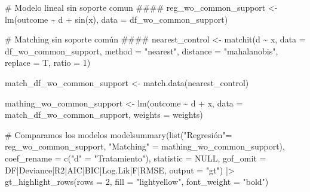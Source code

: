 \documentclass[
  letterpaper,
  DIV=11,
  numbers=noendperiod,
  oneside]{scrreprt}
\newenvironment{Shaded}{\begin{snugshade}}{\end{snugshade}}
\newcommand{\AttributeTok}[1]{\textcolor[rgb]{0.40,0.45,0.13}{#1}}
\newcommand{\CommentTok}[1]{\textcolor[rgb]{0.37,0.37,0.37}{#1}}
\newcommand{\ConstantTok}[1]{\textcolor[rgb]{0.56,0.35,0.01}{#1}}
\newcommand{\DecValTok}[1]{\textcolor[rgb]{0.68,0.00,0.00}{#1}}
\newcommand{\FunctionTok}[1]{\textcolor[rgb]{0.28,0.35,0.67}{#1}}
\newcommand{\NormalTok}[1]{\textcolor[rgb]{0.00,0.23,0.31}{#1}}
\newcommand{\OtherTok}[1]{\textcolor[rgb]{0.00,0.23,0.31}{#1}}
\newcommand{\SpecialCharTok}[1]{\textcolor[rgb]{0.37,0.37,0.37}{#1}}
\newcommand{\StringTok}[1]{\textcolor[rgb]{0.13,0.47,0.30}{#1}}
\begin{document}
\begin{Shaded}
\begin{Highlighting}[]
\CommentTok{\# Modelo lineal sin soporte comun \#\#\#\#}
\NormalTok{reg\_wo\_common\_support }\OtherTok{\textless{}{-}} \FunctionTok{lm}\NormalTok{(outcome }\SpecialCharTok{\textasciitilde{}}\NormalTok{ d }\SpecialCharTok{+} \FunctionTok{sin}\NormalTok{(x), }\AttributeTok{data =}\NormalTok{ df\_wo\_common\_support)}

\CommentTok{\# Matching sin soporte común \#\#\#\#}
\NormalTok{nearest\_control }\OtherTok{\textless{}{-}} \FunctionTok{matchit}\NormalTok{(d }\SpecialCharTok{\textasciitilde{}}\NormalTok{ x, }
                           \AttributeTok{data =}\NormalTok{ df\_wo\_common\_support,}
                           \AttributeTok{method =} \StringTok{"nearest"}\NormalTok{, }
                           \AttributeTok{distance =} \StringTok{"mahalanobis"}\NormalTok{,}
                           \AttributeTok{replace =}\NormalTok{ T,}
                           \AttributeTok{ratio =} \DecValTok{1}\NormalTok{)}

\NormalTok{match\_df\_wo\_common\_support }\OtherTok{\textless{}{-}} \FunctionTok{match.data}\NormalTok{(nearest\_control)}

\NormalTok{mathing\_wo\_common\_support }\OtherTok{\textless{}{-}} \FunctionTok{lm}\NormalTok{(outcome }\SpecialCharTok{\textasciitilde{}}\NormalTok{ d }\SpecialCharTok{+}\NormalTok{ x, }
                     \AttributeTok{data =}\NormalTok{ match\_df\_wo\_common\_support, }
                     \AttributeTok{weights =}\NormalTok{ weights)}

\CommentTok{\# Comparamos los modelos}
\FunctionTok{modelsummary}\NormalTok{(}\FunctionTok{list}\NormalTok{(}\StringTok{"Regresión"}\OtherTok{=}\NormalTok{ reg\_wo\_common\_support,}
                  \StringTok{"Matching"} \OtherTok{=}\NormalTok{ mathing\_wo\_common\_support),}
             \AttributeTok{coef\_rename =} \FunctionTok{c}\NormalTok{(}\StringTok{"d"} \OtherTok{=} \StringTok{"Tratamiento"}\NormalTok{),}
             \AttributeTok{statistic =} \ConstantTok{NULL}\NormalTok{, }
             \AttributeTok{gof\_omit =} \StringTok{\textquotesingle{}DF|Deviance|R2|AIC|BIC|Log.Lik|F|RMSE\textquotesingle{}}\NormalTok{,}
             \AttributeTok{output =} \StringTok{"gt"}\NormalTok{) }\SpecialCharTok{|\textgreater{}}
  \FunctionTok{gt\_highlight\_rows}\NormalTok{(}\AttributeTok{rows =} \DecValTok{2}\NormalTok{, }
                    \AttributeTok{fill =} \StringTok{"lightyellow"}\NormalTok{,}
                    \AttributeTok{font\_weight =} \StringTok{"bold"}\NormalTok{)}
\end{Highlighting}
\end{Shaded}
\end{document}
